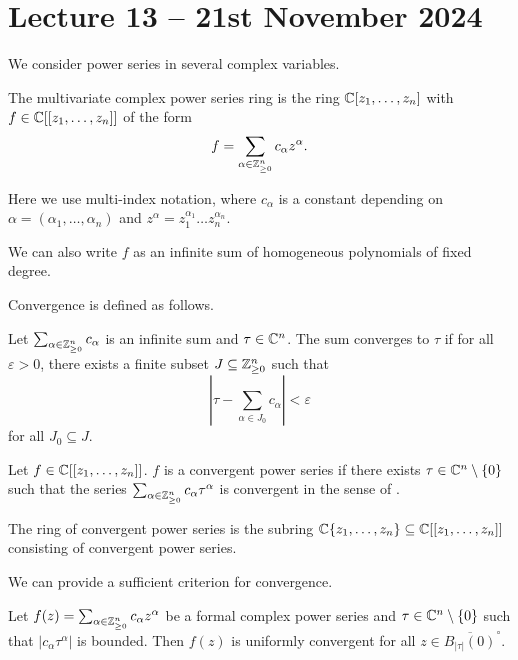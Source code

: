 \section{Lecture 13 -- 21st November 2024}\label{sec: lecture 13}
We consider power series in several complex variables. 
\begin{definition}\label{def: multivariate complex power series}
    The multivariate complex power series ring is the ring $\mathbb{C}[z_{1},\dots,z_{n}]$ with $f\in\mathbb{C}[[z_{1},\dots,z_{n}]]$ of the form 
    $$f=\sum_{\alpha\in\mathbb{Z}_{\geq0}^{n}}c_{\alpha}z^{\alpha}.$$
\end{definition}
\begin{remark}
    Here we use multi-index notation, where $c_{\alpha}$ is a constant depending on $\alpha=(\alpha_{1},\dots,\alpha_{n})$ and $z^{\alpha}=z_{1}^{\alpha_{1}}\dots z_{n}^{\alpha_{n}}$. 
\end{remark}
\begin{remark}
    We can also write $f$ as an infinite sum of homogeneous polynomials of fixed degree. 
\end{remark}
Convergence is defined as follows. 
\begin{definition}\label{def: convergence}
    Let $\sum_{\alpha\in\mathbb{Z}_{\geq0}^{n}}c_{\alpha}$ is an infinite sum and $\tau\in\mathbb{C}^{n}$. The sum converges to $\tau$ if for all $\varepsilon>0$, there exists a finite subset $J\subseteq\mathbb{Z}_{\geq0}^{n}$ such that
    $$\left|\tau-\sum_{\alpha\in J_{0}}c_{\alpha}\right|<\varepsilon$$
    for all $J_{0}\subseteq J$.
\end{definition}
\begin{definition}\label{def: formal power series convergence}
    Let $f\in\mathbb{C}[[z_{1},\dots,z_{n}]]$. $f$ is a convergent power series if there exists $\tau\in\mathbb{C}^{n}\setminus\{0\}$ such that the series $\sum_{\alpha\in\mathbb{Z}_{\geq0}^{n}}c_{\alpha}\tau^{\alpha}$ is convergent in the sense of .
\end{definition}
\begin{definition}\label{def: ring of formal power series}
    The ring of convergent power series is the subring $\mathbb{C}\{z_{1},\dots,z_{n}\}\subseteq\mathbb{C}[[z_{1},\dots,z_{n}]]$ consisting of convergent power series.
\end{definition}
We can provide a sufficient criterion for convergence. 
\begin{proposition}\label{prop: sufficient conditions for convergence}
    Let $f(z)=\sum_{\alpha\in\mathbb{Z}_{\geq0}^{n}}c_{\alpha}z^{\alpha}$ be a formal complex power series and $\tau\in\mathbb{C}^{n}\setminus\{0\}$ such that $|c_{\alpha}\tau^{\alpha}|$ is bounded. Then $f(z)$ is uniformly convergent for all $z\in \overline{B_{|\tau|}(0)}^{\circ}$. 
\end{proposition}
